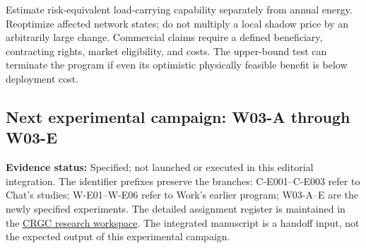 \documentclass[11pt,letterpaper]{article}
\newcommand{\status}[1]{\textbf{Evidence status:} #1}
\begin{document}
Estimate risk-equivalent load-carrying capability separately from annual energy. Reoptimize affected network states; do not multiply a local shadow price by an arbitrarily large change. Commercial claims require a defined beneficiary, contracting rights, market eligibility, and costs. The upper-bound test can terminate the program if even its optimistic physically feasible benefit is below deployment cost.

\subsection{Next experimental campaign: W03-A through W03-E}
\label{sec:w03}
\status{Specified; not launched or executed in this editorial integration.} The identifier prefixes preserve the branches: C-E001--C-E003 refer to Chat's studies; W-E01--W-E06 refer to Work's earlier program; W03-A--E are the newly specified experiments. The detailed assignment register is maintained in the \href{https://chatgpt.com/space/page_dfa9a6f1ac5081919df0487eb77df505}{CRGC research workspace}. The integrated manuscript is a handoff input, not the expected output of this experimental campaign.
\end{document}
